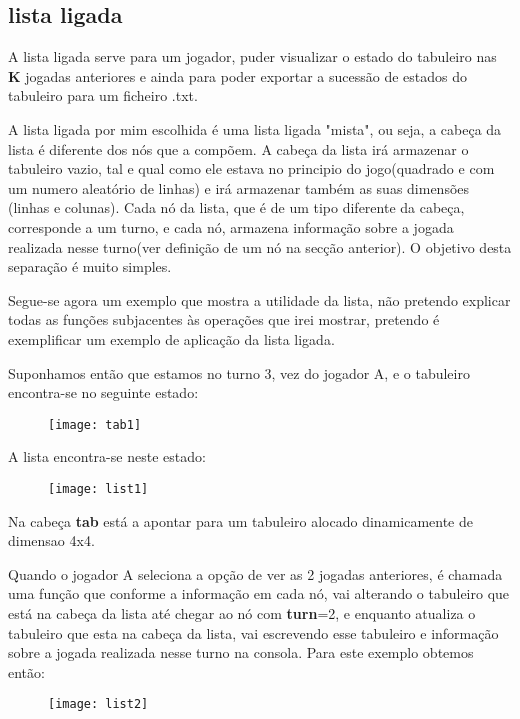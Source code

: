 \documentclass[14pt]{extarticle}
\begin{document}
\newpage
\subsection{lista ligada}
A lista ligada serve para um jogador, puder visualizar o estado do tabuleiro nas \textbf{K} jogadas anteriores e ainda para poder exportar a sucessão de estados do tabuleiro para um ficheiro .txt. 

A lista ligada por mim escolhida é uma lista ligada "mista", ou seja, a cabeça da lista é diferente dos nós que a compõem. A cabeça da lista irá armazenar o tabuleiro vazio, tal e qual como ele estava no principio do jogo(quadrado e com um numero aleatório de linhas) e irá armazenar também as suas dimensões (linhas e colunas). Cada nó da lista, que é de um tipo diferente da cabeça, corresponde a um turno, e cada nó, armazena informação sobre a jogada realizada nesse turno(ver definição de um nó na secção anterior). O objetivo desta separação é muito simples.

Segue-se agora um exemplo que mostra a utilidade da lista, não pretendo explicar todas as funções subjacentes às operações que irei mostrar, pretendo é exemplificar um exemplo de aplicação da lista ligada.

Suponhamos então que estamos no turno 3, vez do jogador A, e o tabuleiro encontra-se no seguinte estado:
\begin{figure}[h]
    \centering
    \texttt{[image: tab1]}
\end{figure}

A lista encontra-se neste estado:
\begin{figure}[h]
    \centering
    \texttt{[image: list1]}
\end{figure}

Na cabeça \textbf{tab} está a apontar para um tabuleiro alocado dinamicamente de dimensao 4x4.

Quando o jogador A seleciona a opção de ver as 2 jogadas anteriores, é chamada uma função que conforme a informação em cada nó, vai alterando o tabuleiro que está na cabeça da lista até chegar ao nó com \textbf{turn}=2, e enquanto atualiza o tabuleiro que esta na cabeça da lista, vai escrevendo esse tabuleiro e informação sobre a jogada realizada nesse turno na consola. Para este exemplo obtemos então:

\begin{figure}[h]
    \centering
    \texttt{[image: list2]}
\end{figure}
\end{document}
